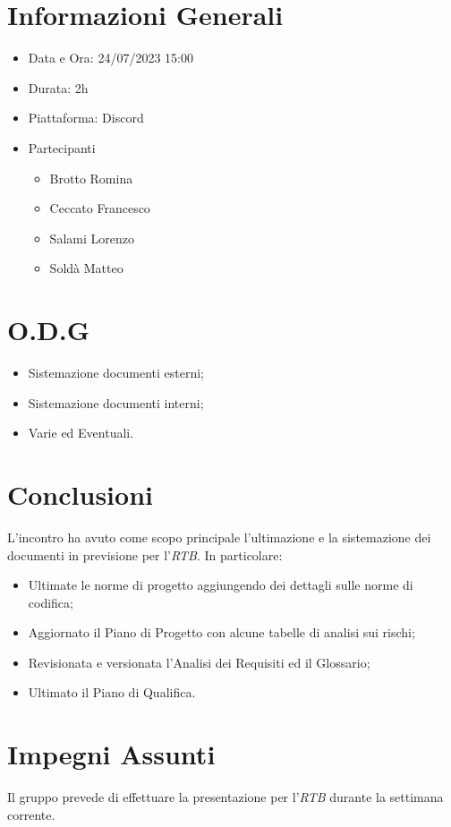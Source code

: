 \documentclass[a4paper, 12pt]{article}
\begin{document}
\makefrontpage

\section*{Informazioni Generali}
\begin{itemize}
    \item Data e Ora: 24/07/2023 15:00
    \item Durata: 2h
    \item Piattaforma: Discord
    \item Partecipanti
    \begin{itemize}
        \item Brotto Romina
        \item Ceccato Francesco
        \item Salami Lorenzo
        \item Soldà Matteo
    \end{itemize}
\end{itemize}

\section*{O.D.G}
\begin{itemize}
    \item Sistemazione documenti esterni;
    \item Sistemazione documenti interni;
    \item Varie ed Eventuali.
\end{itemize}

\section*{Conclusioni}
L'incontro ha avuto come scopo principale l'ultimazione e la sistemazione dei documenti in previsione per l'\textit{RTB}.
In particolare:
\begin{itemize}
    \item Ultimate le norme di progetto aggiungendo dei dettagli sulle norme di codifica;
    \item Aggiornato il Piano di Progetto con alcune tabelle di analisi sui rischi;
    \item Revisionata e versionata l'Analisi dei Requisiti ed il Glossario;
    \item Ultimato il Piano di Qualifica.
\end{itemize}

\section*{Impegni Assunti}
Il gruppo prevede di effettuare la presentazione per l'\textit{RTB} durante la settimana corrente.
\end{document}
